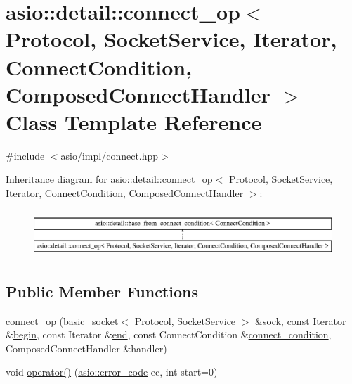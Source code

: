 \hypertarget{classasio_1_1detail_1_1connect__op}{}\section{asio\+:\+:detail\+:\+:connect\+\_\+op$<$ Protocol, Socket\+Service, Iterator, Connect\+Condition, Composed\+Connect\+Handler $>$ Class Template Reference}
\label{classasio_1_1detail_1_1connect__op}


{\ttfamily \#include $<$asio/impl/connect.\+hpp$>$}

Inheritance diagram for asio\+:\+:detail\+:\+:connect\+\_\+op$<$ Protocol, Socket\+Service, Iterator, Connect\+Condition, Composed\+Connect\+Handler $>$\+:\begin{figure}[H]
\begin{center}
\leavevmode
\includegraphics[height=1.774960cm]{classasio_1_1detail_1_1connect__op}
\end{center}
\end{figure}
\subsection*{Public Member Functions}
\begin{DoxyCompactItemize}
\item 
\hyperlink{classasio_1_1detail_1_1connect__op_a457fd005df6d071fd4961facdc6ce8f8}{connect\+\_\+op} (\hyperlink{classasio_1_1basic__socket}{basic\+\_\+socket}$<$ Protocol, Socket\+Service $>$ \&sock, const Iterator \&\hyperlink{group__async__connect_ga7055bca9225050c030c19c7dc926fa53}{begin}, const Iterator \&\hyperlink{group__async__connect_gadb6ad0193229ae84828688e812cd325c}{end}, const Connect\+Condition \&\hyperlink{group__async__connect_ga47e3dda205dfba3553f4c7e005897687}{connect\+\_\+condition}, Composed\+Connect\+Handler \&handler)
\item 
void \hyperlink{classasio_1_1detail_1_1connect__op_a10b7cf4ce856a75ebf1ad080551b3517}{operator()} (\hyperlink{classasio_1_1error__code}{asio\+::error\+\_\+code} ec, int start=0)
\end{DoxyCompactItemize}
